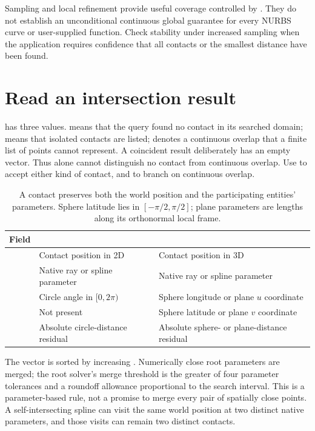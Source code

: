 \begin{manualnote}
Sampling and local refinement provide useful coverage controlled by
. They do not establish an unconditional continuous global
guarantee for every NURBS curve or user-supplied function. Check stability under
increased sampling when the application requires confidence that all contacts
or the smallest distance have been found.
\end{manualnote}

\section{Read an intersection result}

 has three values.  means that the query found
no contact in its searched domain;  means that isolated contacts
are listed;  denotes a continuous overlap that a finite list of
points cannot represent. A coincident result deliberately has an empty
 vector. Thus  alone cannot distinguish no
contact from continuous overlap. Use  to accept either
kind of contact, and  to branch on continuous overlap.

\begin{table}[htbp]
\centering
\small
\begin{tabularx}{\linewidth}{@{}l Y Y@{}}
\toprule
Field &  &  \\
\midrule
{} & Contact position in 2D & Contact position in 3D \\
 & Native ray or spline parameter & Native ray or spline parameter \\
 & Circle angle in $[0,2\pi)$ & Sphere longitude or plane $u$ coordinate \\
 & Not present & Sphere latitude or plane $v$ coordinate \\
 & Absolute circle-distance residual & Absolute sphere- or plane-distance residual \\
\bottomrule
\end{tabularx}
\caption{A contact preserves both the world position and the participating
entities' parameters. Sphere latitude lies in $[-\pi/2,\pi/2]$; plane parameters
are lengths along its orthonormal local frame.}
\end{table}

The vector  is sorted by increasing . Numerically close
root parameters are merged; the root solver's merge threshold is the greater
of four parameter tolerances and a roundoff allowance proportional to the
search interval. This is a parameter-based rule, not a promise to merge every
pair of spatially close points. A self-intersecting spline can visit the same
world position at two distinct native parameters, and those visits can remain
two distinct contacts.


